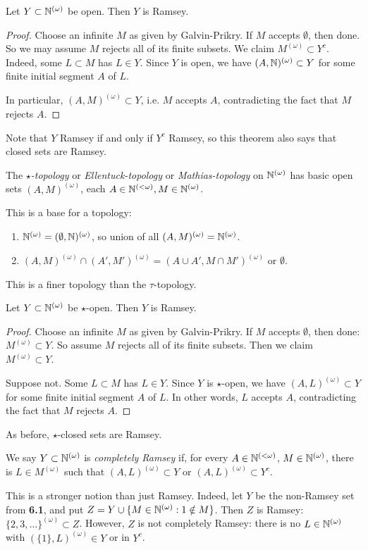 \documentclass[10pt,a4paper]{article}
\begin{document}
\begin{theorem}
  Let $Y \subset \mathbb{N}^{(\omega)}$ be open. Then $Y$ is Ramsey.
\end{theorem}
\begin{proof}
  Choose an infinite $M$ as given by Galvin-Prikry. If $M$ accepts $\emptyset$, then done. So we may assume $M$ rejects all of its finite subsets. We claim $M^{(\omega)} \subset Y^c$. Indeed, some $L \subset M$ has $L \in Y$. Since $Y$ is open, we have $(A, \mathbb{N})^{(\omega)} \subset Y$ for some finite initial segment $A$ of $L$.

  In particular, $(A, M)^{(\omega)}\subset Y$, i.e. $M$ accepts $A$, contradicting the fact that $M$ rejects $A$.
\end{proof}
Note that $Y$ Ramsey if and only if $Y^c$ Ramsey, so this theorem also says that closed sets are Ramsey.

\begin{definition}
  The \emph{$\star$-topology} or \emph{Ellentuck-topology} or \emph{Mathias-topology} on $\mathbb{N}^{(\omega)}$ has basic open sets $(A, M)^{(\omega)}$, each $A \in \mathbb{N}^{(<\omega)}, M \in \mathbb{N}^{(\omega)}$.
\end{definition}
This is a base for a topology:
\begin{enumerate}
  \item $\mathbb{N}^{(\omega)} = (\emptyset, \mathbb{N})^{(\omega)}$, so union of all $(A, M)^{(\omega)} = \mathbb{N}^{(\omega)}$.
  \item $(A,M)^{(\omega)} \cap (A', M')^{(\omega)} = (A\cup A', M \cap M')^{(\omega)}$ or $\emptyset$.
\end{enumerate}
This is a finer topology than the $\tau$-topology.
\begin{theorem}
  Let $Y \subset \mathbb{N}^{(\omega)}$ be $\star$-open. Then $Y$ is Ramsey.
\end{theorem}
\begin{proof}
  Choose an infinite $M$ as given by Galvin-Prikry. If $M$ accepts $\emptyset$, then done: $M^{(\omega)} \subset Y$. So assume $M$ rejects all of its finite subsets. Then we claim $M^{(\omega)} \subset Y$.

  Suppose not. Some $L \subset M$ has $L \in Y$. Since $Y$  is $\star$-open, we have $(A, L)^{(\omega)}\subset Y$ for some finite initial segment $A$ of $L$. In other words, $L$ accepts $A$, contradicting the fact that $M$ rejects $A$.
\end{proof}
As before, $\star$-closed sets are Ramsey.

\begin{definition}
  We say $Y \subset \mathbb{N}^{(\omega)}$ is \emph{completely Ramsey} if, for every $A \in \mathbb{N}^{(<\omega)}$, $M \in \mathbb{N}^{(\omega)}$, there is $L \in M^{(\omega)}$ such that $(A,L)^{(\omega)}\subset Y$ or $(A, L)^{(\omega)}\subset Y^c$.
\end{definition}
This is a stronger notion than just Ramsey. Indeed, let $Y$ be the non-Ramsey set from \textbf{6.1}, and put $Z = Y \cup \{M \in \mathbb{N}^{(\omega)}: 1 \notin M\}$. Then $Z$ is Ramsey: $\{2, 3, \ldots\}^{(\omega)} \subset Z$. However, $Z$ is not completely Ramsey: there is no $L \in \mathbb{N}^{(\omega)}$ with $(\{1\}, L)^{(\omega)} \in Y$ or in $Y^c$.
\end{document}
